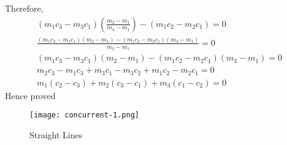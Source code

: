 \documentclass[12pt]{article}
\providecommand{\brak}[1]{\ensuremath{\left(#1\right)}}
\begin{document}
\begin{enumerate}
Therefore,
\begin{align}
\brak{m_1c_3-m_3c_1}\brak{\frac{m_2-m_1}{m_3-m_1}}-\brak{m_1c_2-m_2c_1}=0\\
\frac{\brak{m_1c_3-m_3c_1}\brak{m_2-m_1}-\brak{m_1c_2-m_2c_1}\brak{m_3-m_1}}{m_3-m_1}=0\\
\brak{m_1c_3-m_3c_1}\brak{m_2-m_1}-\brak{m_1c_2-m_2c_1}\brak{m_3-m_1}=0\\
m_2c_3-m_1c_3+m_3c_1-m_3c_2+m_1c_2-m_2c_1=0\\
m_1\brak{c_2-c_3}+m_2\brak{c_3-c_1}+m_3\brak{c_1-c_2} = 0
\end{align}
           Hence proved
\begin{figure}[h]
    \centering
    \texttt{[image: concurrent-1.png]}
    \caption{Straight Lines}
    \label{fig:concurrent-1.png}
\end{figure}
\end{enumerate}
\end{document}
